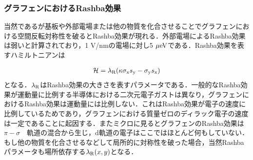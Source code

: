 \subsubsection{グラフェンにおけるRashba効果}
当然であるが基板や外部電場または他の物質を化合させることでグラフェンにおける空間反転対称性を破るとRashba効果が現れる．外部電場によるRashba効果は弱いと計算されており，1 V/nmの電場に対し5$\rm\ \mu eV$である．Rashba効果を表すハミルトニアンは

\begin{eqnarray}
\mathcal{H} = \lambda_{\rm R}(\kappa\sigma_{\rm x}s_{\rm y}-\sigma_{\rm y}s_{\rm x})
\label{eq:RashbaHamil_gra}
\end{eqnarray}
となる．$\lambda_{\rm R}$はRashba効果の大きさを表すパラメータである．一般的なRashba効果が運動量に比例する半導体における二次元電子ガストは異なり，グラフェンにおけるRashba効果は運動量には比例しない．これはRashba効果が電子の速度に比例しているためであり，グラフェンにおける質量ゼロのディラック電子の速度は一定であることに起因する．またミクロに見るとグラフェンのRashba効果は$\pi-\sigma$　軌道の混合から生じ，d軌道の電子はここではほとんど何もしていない．もし他の物質を化合させるなどして局所的に対称性を破った場合，当然Rashbaパラメータも場所依存する$\lambda_{\rm R}(x,y)$となる．

